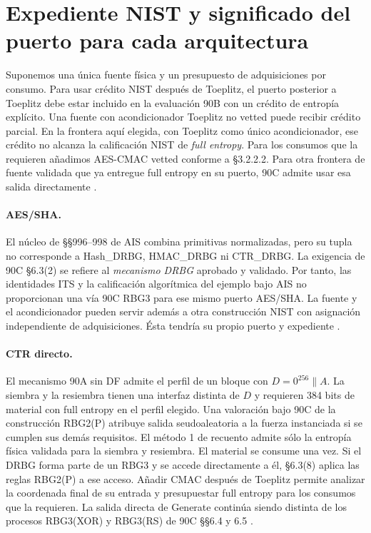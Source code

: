 \section{Expediente NIST y significado del puerto para cada arquitectura}
\label{sec:puertos-nist}
Suponemos una única fuente física y un presupuesto de adquisiciones por
consumo. Para usar crédito NIST después de Toeplitz, el puerto posterior
a Toeplitz debe estar incluido en la evaluación 90B con un crédito de
entropía explícito. Una fuente con acondicionador Toeplitz no vetted
puede recibir crédito parcial. En la frontera aquí elegida, con Toeplitz
como único acondicionador, ese crédito no alcanza la calificación NIST de
\emph{full entropy}. Para los consumos que la requieren añadimos
AES-CMAC vetted conforme a §3.2.2.2. Para otra frontera de fuente validada que ya entregue
full entropy en su puerto, 90C admite usar esa salida directamente
\cite[§3.1.5]{nist90b}\cite{nist-vetted}\cite[§§3.1--3.2, 6.3(1)--(7)]{nist90c}.

\paragraph{AES/SHA.}
El núcleo de §§996--998 de AIS combina primitivas normalizadas, pero
su tupla no corresponde a Hash\_DRBG, HMAC\_DRBG ni CTR\_DRBG. La exigencia
de 90C §6.3(2) se refiere al \emph{mecanismo DRBG} aprobado y validado.
Por tanto, las identidades ITS y la calificación algorítmica del ejemplo
bajo AIS no proporcionan una vía 90C RBG3 para ese mismo puerto
AES/SHA. La fuente y el acondicionador pueden servir además a otra
construcción NIST con asignación independiente de adquisiciones.
Ésta tendría su propio puerto y expediente \cite[§§996--998]{ais}\cite[§6.3]{nist90c}.

\paragraph{CTR directo.}
El mecanismo 90A sin DF admite el perfil de un bloque con
$D=0^{256}\|A$. La siembra y la resiembra tienen una interfaz distinta de
$D$ y requieren 384 bits de material con full entropy en el perfil elegido.
Una valoración bajo 90C de la construcción RBG2(P) atribuye salida
seudoaleatoria a la fuerza instanciada si se cumplen sus demás requisitos.
El método 1 de recuento admite sólo la entropía física validada para la
siembra y resiembra. El material se consume una vez. Si el DRBG forma
parte de un RBG3 y se accede directamente a él, §6.3(8) aplica las reglas
RBG2(P) a ese acceso.
Añadir CMAC después de Toeplitz permite analizar la coordenada final de
su entrada y presupuestar full entropy para los consumos que la requieren.
La salida directa de Generate continúa siendo distinta de los procesos
RBG3(XOR) y RBG3(RS) de 90C §§6.4 y 6.5
\cite[tabla 3 y §10.2.1]{nist90a}\cite[§§5.3(1)--(3),(6)--(7),(9),(11),6.2--6.5]{nist90c}.

